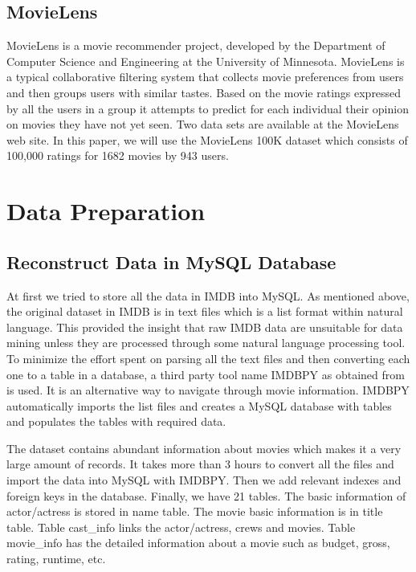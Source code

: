 \documentclass[conference]{IEEEtran}
\begin{document}
\subsection{MovieLens}
MovieLens is a movie recommender project, developed by the Department of Computer Science and Engineering at the University of Minnesota. MovieLens is a typical collaborative filtering system that collects movie preferences from users and then groups users with similar tastes. Based on the movie ratings expressed by all the users in a group it attempts to predict for each individual their opinion on movies they have not yet seen. Two data sets are available at the MovieLens web site\cite{movielens}. In this paper, we will use the MovieLens 100K dataset which consists of 100,000 ratings for 1682 movies by 943 users.


\section{Data Preparation}

\subsection{Reconstruct Data in MySQL Database}
At first we tried to store all the data in IMDB into MySQL. As mentioned above, the original dataset in IMDB is in text files which is a list format within natural language. This provided the insight that raw IMDB data are unsuitable for data mining unless they are processed through some natural language processing tool. To minimize the effort spent on parsing all the text files and then converting each one to a table in a database, a third party tool name IMDBPY as obtained from\cite{imdbpy} is used. It is an alternative way to navigate through movie information. IMDBPY automatically imports the list files and creates a MySQL database with tables and populates the tables with required data. 

The dataset contains abundant information about movies which makes it a very large amount of records. It takes more than 3 hours to convert all the files and import the data into MySQL with IMDBPY. Then we add relevant indexes and foreign keys in the database. Finally, we have 21 tables. The basic information of actor/actress is stored in name table. The movie basic information is in title table. Table cast\_info links the actor/actress, crews and movies. Table movie\_info has the detailed information about a movie such as budget, gross, rating, runtime, etc.
\end{document}
